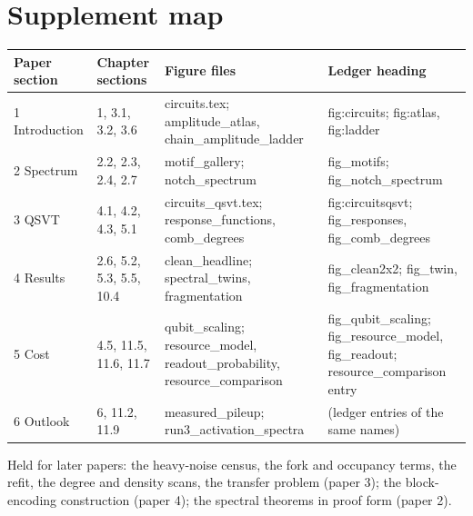 \documentclass[11pt,a4paper]{article}
\begin{document}
\section*{Supplement map}
\begin{center}\footnotesize
\begin{tabular}{p{2.1cm}p{2.6cm}p{5.6cm}p{4.6cm}}\toprule
Paper section & Chapter sections & Figure files & Ledger heading \\\midrule
1 Introduction & 1, 3.1, 3.2, 3.6 & circuits.tex; amplitude\_atlas, chain\_amplitude\_ladder & fig:circuits; fig:atlas, fig:ladder \\
2 Spectrum & 2.2, 2.3, 2.4, 2.7 & motif\_gallery; notch\_spectrum & fig\_motifs; fig\_notch\_spectrum \\
3 QSVT & 4.1, 4.2, 4.3, 5.1 & circuits\_qsvt.tex; response\_functions, comb\_degrees & fig:circuitsqsvt; fig\_responses, fig\_comb\_degrees \\
4 Results & 2.6, 5.2, 5.3, 5.5, 10.4 & clean\_headline; spectral\_twins, fragmentation & fig\_clean2x2; fig\_twin, fig\_fragmentation \\
5 Cost & 4.5, 11.5, 11.6, 11.7 & qubit\_scaling; resource\_model, readout\_probability, resource\_comparison & fig\_qubit\_scaling; fig\_resource\_model, fig\_readout; resource\_comparison entry \\
6 Outlook & 6, 11.2, 11.9 & measured\_pileup; run3\_activation\_spectra & (ledger entries of the same names) \\\bottomrule
\end{tabular}
\end{center}
\noindent Held for later papers: the heavy-noise census, the fork and occupancy terms, the refit, the degree and density scans, the transfer problem (paper 3); the block-encoding construction (paper 4); the spectral theorems in proof form (paper 2).
\end{document}
